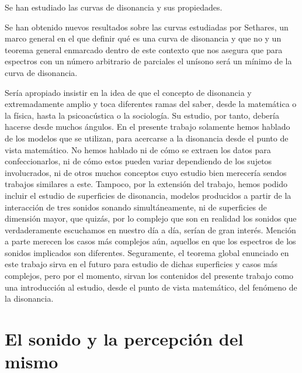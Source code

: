 \documentclass[11pt,a4paper]{article}
\begin{document}
Se han estudiado las curvas de disonancia y sus propiedades.

Se han obtenido nuevos resultados sobre las curvas estudiadas por Sethares, un marco general en el que definir qué es una curva de disonancia y que no y un teorema general enmarcado dentro de este contexto que nos asegura que para espectros con un número arbitrario de parciales el unísono será un mínimo de la curva de disonancia.

Sería apropiado insistir en la idea de que el concepto de disonancia y extremadamente amplio y toca diferentes ramas del saber, desde la matemática o la física, hasta la psicoacústica o la sociología. Su estudio, por tanto, debería hacerse desde muchos ángulos. En el presente trabajo solamente hemos hablado de los modelos que se utilizan, para acercarse a la disonancia desde el punto de vista matemático. No hemos hablado ni de cómo se extraen los datos para confeccionarlos, ni de cómo estos pueden variar dependiendo de los sujetos involucrados, ni de otros muchos conceptos cuyo estudio bien merecería sendos trabajos similares a este. Tampoco, por la extensión del trabajo, hemos podido incluir el estudio de superficies de disonancia, modelos producidos a partir de la interacción de tres sonidos sonando simultáneamente, ni de superficies de dimensión mayor, que quizás, por lo complejo que son en realidad los sonidos que verdaderamente escuchamos en nuestro día a día, serían de gran interés. Mención a parte merecen los casos más complejos aún, aquellos en que los espectros de los sonidos implicados son diferentes. Seguramente, el teorema global enunciado en este trabajo sirva en el futuro para estudio de dichas superficies y casos más complejos, pero por el momento, sirvan los contenidos del presente trabajo como una introducción al estudio, desde el punto de vista matemático, del fenómeno de la disonancia.



\newpage


\section{El sonido y la percepción del mismo}

\end{document}
